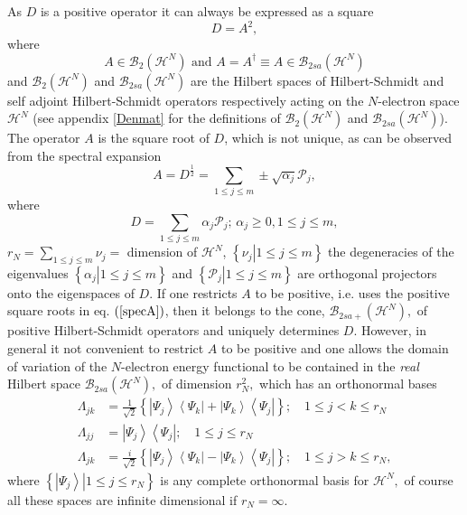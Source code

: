 \documentclass[aps,preprint]{revtex4}%
\begin{document}
As $D$ is a positive operator it can always be expressed as a square
\begin{equation}
D=A^{2},
\end{equation}
where
\begin{equation}
A\in\mathcal{B}_{2}\left(  \mathcal{H}^{N}\right)  \text{ and }A=A^{\dagger
}\equiv A\in\mathcal{B}_{2sa}\left(  \mathcal{H}^{N}\right)
\end{equation}
and $\mathcal{B}_{2}\left(  \mathcal{H}^{N}\right)  $ and $\mathcal{B}%
_{2sa}\left(  \mathcal{H}^{N}\right)  $ are the Hilbert spaces of
Hilbert-Schmidt and self adjoint Hilbert-Schmidt operators respectively acting
on the $N$-electron space $\mathcal{H}^{N}$ (see appendix \ref{Denmat} for the
definitions of $\mathcal{B}_{2}\left(  \mathcal{H}^{N}\right)  $ and
$\mathcal{B}_{2sa}\left(  \mathcal{H}^{N}\right)  $). The operator $A$ is the
square root of $D$, which is not unique, as can be observed from the spectral
expansion
\begin{equation}
A=D^{\frac{1}{2}}=\sum_{1\leq j\leq m}\pm\sqrt{\alpha_{j}}\mathcal{P}_{j},
\label{specA}%
\end{equation}
where
\begin{equation}
D=\sum_{1\leq j\leq m}\alpha_{j}\mathcal{P}_{j};\,\alpha_{j}\geq0,1\leq j\leq
m,
\end{equation}
$r_{N}=\sum\limits_{1\leq j\leq m}\nu_{j}=$ dimension of $\mathcal{H}^{N}$,
$\left\{  \left.  \nu_{j}\right\vert 1\leq j\leq m\right\}  $ the degeneracies
of the eigenvalues $\left\{  \left.  \alpha_{j}\right\vert 1\leq j\leq
m\right\}  $ and $\left\{  \left.  \mathcal{P}_{j}\right\vert 1\leq j\leq
m\right\}  $ are orthogonal projectors onto the eigenspaces of $D$. If one
restricts $A$ to be positive, i.e. uses the positive square roots in eq.
$\left(  \ref{specA}\right)  $, then it belongs to the cone, $\mathcal{B}%
_{2sa+}\left(  \mathcal{H}^{N}\right)  ,$ \cite{Encyclo} of positive
Hilbert-Schmidt operators and uniquely determines $D$. However, in general it
not convenient to restrict $A$ to be positive and one allows the domain of
variation of the $N$-electron energy functional to be contained in the
\emph{real} Hilbert space $\mathcal{B}_{2sa}\left(  \mathcal{H}^{N}\right)  ,$
of dimension $r_{N}^{2},$ which has an orthonormal bases
\begin{align}
\Lambda_{jk}  &  =\frac{1}{\sqrt{2}}\left\{  \left\vert \Psi_{j}\right\rangle
\left\langle \Psi_{k}\right\vert +\left\vert \Psi_{k}\right\rangle
\left\langle \Psi_{j}\right\vert \right\}  ;\quad1\leq j<k\leq r_{N}%
\nonumber\\
\Lambda_{jj}  &  =\left\vert \Psi_{j}\right\rangle \left\langle \Psi
_{j}\right\vert ;\quad1\leq j\leq r_{N}\nonumber\\
\Lambda_{jk}  &  =\frac{i}{\sqrt{2}}\left\{  \left\vert \Psi_{j}\right\rangle
\left\langle \Psi_{k}\right\vert -\left\vert \Psi_{k}\right\rangle
\left\langle \Psi_{j}\right\vert \right\}  ;\quad1\leq j>k\leq r_{N},
\end{align}
where $\left\{  \left.  \left\vert \Psi_{j}\right\rangle \right\vert 1\leq
j\leq r_{N}\right\}  $ is any complete orthonormal basis for $\mathcal{H}%
^{N},$ of course all these spaces are infinite dimensional if $r_{N}=\infty.$
\end{document}
